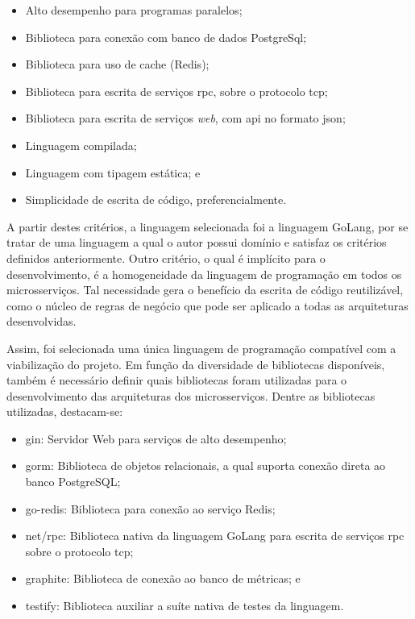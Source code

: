 \begin{itemize}
  \item Alto desempenho para programas paralelos;
  \item Biblioteca para conexão com banco de dados PostgreSql;
  \item Biblioteca para uso de cache (Redis);
  \item Biblioteca para escrita de serviços \ac{rpc}, sobre o protocolo \ac{tcp};
  \item Biblioteca para escrita de serviços \textit{web}, com \ac{api} no formato \ac{json};
  \item Linguagem compilada;
  \item Linguagem com tipagem estática; e
  \item Simplicidade de escrita de código, preferencialmente.
\end{itemize}



A partir destes critérios, a linguagem selecionada foi a linguagem GoLang, por se tratar de uma linguagem a qual o autor possui domínio e satisfaz os critérios definidos anteriormente.
%
Outro critério, o qual é implícito para o desenvolvimento, é a homogeneidade da linguagem de programação em todos os microsserviços.
%
Tal necessidade gera o benefício da escrita de código reutilizável, como o núcleo de regras de negócio que pode ser aplicado a todas as arquiteturas desenvolvidas.



Assim, foi selecionada uma única linguagem de programação compatível com a viabilização do projeto.
%
Em função da diversidade de bibliotecas disponíveis, também é necessário definir quais bibliotecas foram utilizadas para o desenvolvimento das arquiteturas dos microsserviços.
%
Dentre as bibliotecas utilizadas, destacam-se:



\begin{itemize}
  \item gin: Servidor Web para serviços de alto desempenho;
  \item gorm: Biblioteca de objetos relacionais, a qual suporta conexão direta ao banco PostgreSQL;
  \item go-redis: Biblioteca para conexão ao serviço Redis;
  \item net/rpc: Biblioteca nativa da linguagem GoLang para escrita de serviços \ac{rpc} sobre o protocolo \ac{tcp};
  \item graphite: Biblioteca de conexão ao banco de métricas; e
  \item testify: Biblioteca auxiliar a suíte nativa de testes da linguagem.
\end{itemize}



